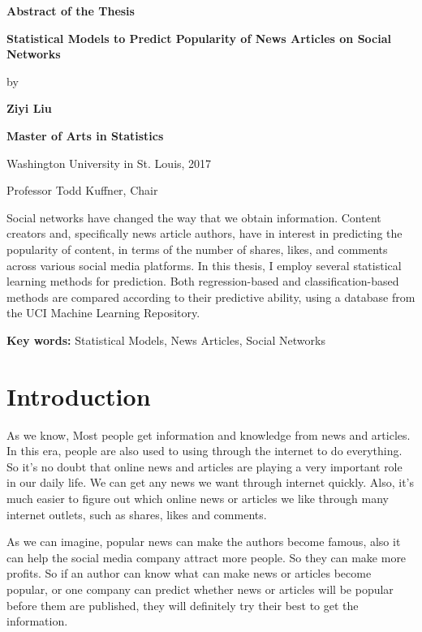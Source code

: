 \documentclass[12pt]{article}
\begin{document}
\newpage


\centerline{\bf{Abstract of the Thesis}}
\vspace*{1\baselineskip}
\centerline{\bf{Statistical Models to Predict Popularity of News Articles on Social Networks}}
\vspace*{1\baselineskip}
\centerline{by}
\vspace*{1\baselineskip}
\centerline{\bf{Ziyi Liu}}
\vspace*{1\baselineskip}
\centerline{\bf{Master of Arts in Statistics}}
\vspace*{1\baselineskip}
\centerline{Washington University in St. Louis, 2017}
\vspace*{1\baselineskip}
\centerline{Professor Todd Kuffner, Chair}
\vspace*{2\baselineskip}
Social networks have changed the way that we obtain information. Content creators and, specifically news article authors, have in interest in predicting the popularity of content, in terms of the number of shares, likes, and comments across various social media platforms. In this thesis, I employ several statistical learning methods for prediction. Both regression-based and classification-based methods are compared according to their predictive ability, using a database from the UCI Machine Learning Repository.\\
\vspace*{1\baselineskip}
\vspace*{1\baselineskip}

{\bf{Key words:}} Statistical Models, News Articles, Social Networks
\newpage
\setcounter{page}{1}
\section{Introduction}
As we know, Most people get information and knowledge from news and articles. In this era, people are also used to using through the internet to do everything. So it’s no doubt that online news and articles are playing a very important role in our daily life. We can get any news we want through internet quickly. Also, it’s much easier to figure out which online news or articles we like through many internet outlets, such as shares, likes and comments. 

As we can imagine, popular news can make the authors become famous, also it can help the social media company attract more people. So they can make more profits. So if an author can know what can make news or articles become popular, or one company can predict whether news or articles will be popular before them are published, they will definitely try their best to get the information. 
\end{document}
